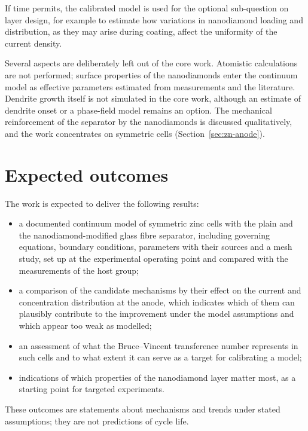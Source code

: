 If time permits, the calibrated model is used for the optional sub-question on layer design, for example to estimate how variations in nanodiamond loading and distribution, as they may arise during coating, affect the uniformity of the current density.

Several aspects are deliberately left out of the core work.
Atomistic calculations are not performed; surface properties of the nanodiamonds enter the continuum model as effective parameters estimated from measurements and the literature.
Dendrite growth itself is not simulated in the core work, although an estimate of dendrite onset or a phase-field model remains an option.
The mechanical reinforcement of the separator by the nanodiamonds is discussed qualitatively, and the work concentrates on symmetric cells (Section~\ref{sec:zn-anode}).

\section{Expected outcomes}

The work is expected to deliver the following results:
\begin{itemize}
  \item a documented continuum model of symmetric zinc cells with the plain and the nanodiamond-modified glass fibre separator, including governing equations, boundary conditions, parameters with their sources and a mesh study, set up at the experimental operating point and compared with the measurements of the host group;
  \item a comparison of the candidate mechanisms by their effect on the current and concentration distribution at the anode, which indicates which of them can plausibly contribute to the improvement under the model assumptions and which appear too weak as modelled;
  \item an assessment of what the Bruce--Vincent transference number represents in such cells and to what extent it can serve as a target for calibrating a model;
  \item indications of which properties of the nanodiamond layer matter most, as a starting point for targeted experiments.
\end{itemize}

These outcomes are statements about mechanisms and trends under stated assumptions; they are not predictions of cycle life.

